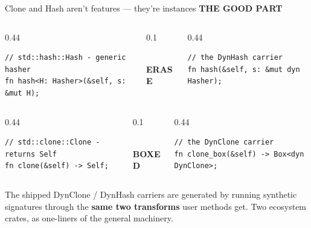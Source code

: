 \documentclass[aspectratio=169,11pt,t]{beamer}
\newcommand{\code}[1]{{\ttfamily\small\color{oxidesoft}#1}}
\newcommand{\eyebrow}[2][steel]{{\ttfamily\scriptsize\bfseries\color{#1}\MakeUppercase{#2}}\par\vspace{0.4em}}
\newcommand{\lede}[1]{{\color{muted}\fontsize{13}{18.5}\selectfont #1\par}}
\newcommand{\tx}[1]{{\color{text}\bfseries#1}}
\begin{document}
\begin{frame}[fragile]{Clone and Hash aren't features --- they're instances}
\eyebrow[oxide]{The good part}
\vspace{0.2em}
\begin{columns}[c]
\begin{column}{0.44\textwidth}
\begin{lstlisting}
// std::hash::Hash - generic hasher
fn hash<H: Hasher>(&self, s: &mut H);
\end{lstlisting}
\end{column}
\begin{column}{0.1\textwidth}
\begin{center}{\ttfamily\scriptsize\bfseries\colorbox{steel}{\color{ground}\,ERASE\,}}\end{center}
\end{column}
\begin{column}{0.44\textwidth}
\begin{lstlisting}
// the DynHash carrier
fn hash(&self, s: &mut dyn Hasher);
\end{lstlisting}
\end{column}
\end{columns}
\vspace{0.6em}
\begin{columns}[c]
\begin{column}{0.44\textwidth}
\begin{lstlisting}
// std::clone::Clone - returns Self
fn clone(&self) -> Self;
\end{lstlisting}
\end{column}
\begin{column}{0.1\textwidth}
\begin{center}{\ttfamily\scriptsize\bfseries\colorbox{oxide}{\color{ground}\,BOXED\,}}\end{center}
\end{column}
\begin{column}{0.44\textwidth}
\begin{lstlisting}
// the DynClone carrier
fn clone_box(&self) -> Box<dyn DynClone>;
\end{lstlisting}
\end{column}
\end{columns}
\vspace{0.9em}
\lede{The shipped \code{DynClone} / \code{DynHash} carriers are generated by running synthetic signatures through the \tx{same two transforms} user methods get. Two ecosystem crates, as one-liners of the general machinery.}
\end{frame}
\end{document}
